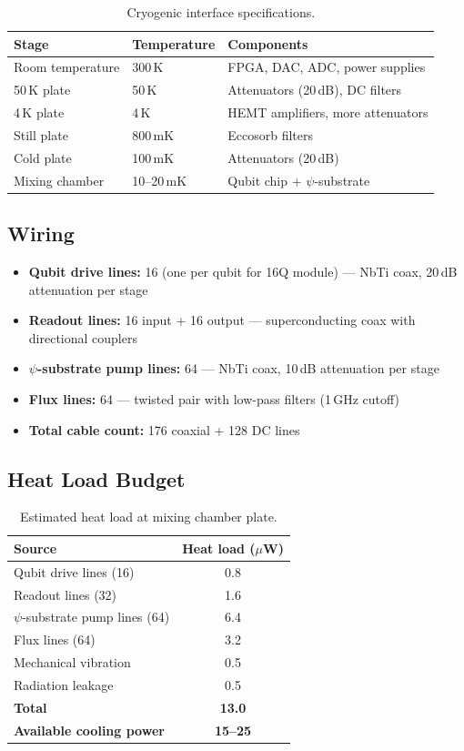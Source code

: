 \documentclass[11pt,letterpaper]{article}
\begin{document}
\begin{table}[H]
\caption{Cryogenic interface specifications.}
\begin{tabular}{lll}
\toprule
\textbf{Stage} & \textbf{Temperature} & \textbf{Components} \\
\midrule
Room temperature & 300\,K & FPGA, DAC, ADC, power supplies \\
50\,K plate & 50\,K & Attenuators (20\,dB), DC filters \\
4\,K plate & 4\,K & HEMT amplifiers, more attenuators \\
Still plate & 800\,mK & Eccosorb filters \\
Cold plate & 100\,mK & Attenuators (20\,dB) \\
Mixing chamber & 10--20\,mK & Qubit chip + $\psi$-substrate \\
\bottomrule
\end{tabular}
\end{table}

\subsection{Wiring}

\begin{itemize}
\item \textbf{Qubit drive lines:} 16 (one per qubit for 16Q module)
--- NbTi coax, 20\,dB attenuation per stage
\item \textbf{Readout lines:} 16 input + 16 output --- superconducting
coax with directional couplers
\item \textbf{$\psi$-substrate pump lines:} 64 --- NbTi coax, 10\,dB
attenuation per stage
\item \textbf{Flux lines:} 64 --- twisted pair with low-pass filters
(1\,GHz cutoff)
\item \textbf{Total cable count:} 176 coaxial + 128 DC lines
\end{itemize}

\subsection{Heat Load Budget}

\begin{table}[H]
\caption{Estimated heat load at mixing chamber plate.}
\begin{tabular}{lc}
\toprule
\textbf{Source} & \textbf{Heat load ($\mu$W)} \\
\midrule
Qubit drive lines (16) & 0.8 \\
Readout lines (32) & 1.6 \\
$\psi$-substrate pump lines (64) & 6.4 \\
Flux lines (64) & 3.2 \\
Mechanical vibration & 0.5 \\
Radiation leakage & 0.5 \\
\midrule
\textbf{Total} & \textbf{13.0} \\
\textbf{Available cooling power} & \textbf{15--25} \\
\bottomrule
\end{tabular}
\end{table}
\end{document}
